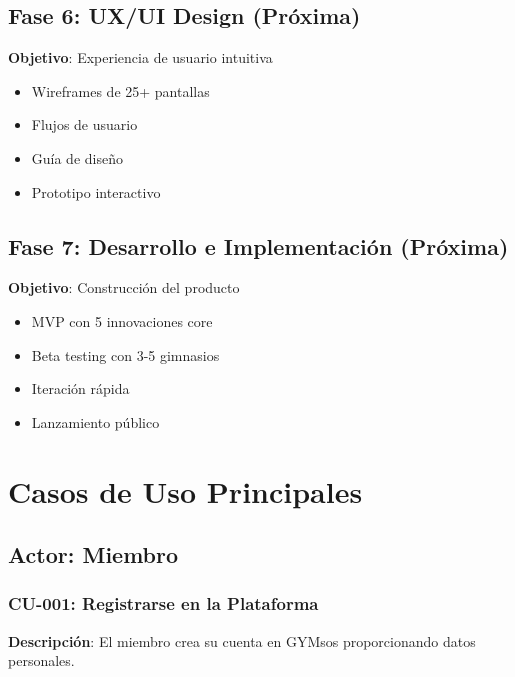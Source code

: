 \documentclass[11pt,a4paper]{article}
\begin{document}
\begin{itemize}
\subsection{Fase 6: UX/UI Design (Próxima)}

\textbf{Objetivo}: Experiencia de usuario intuitiva

\begin{itemize}
    \item Wireframes de 25+ pantallas
    \item Flujos de usuario
    \item Guía de diseño
    \item Prototipo interactivo
\end{itemize}

\subsection{Fase 7: Desarrollo e Implementación (Próxima)}

\textbf{Objetivo}: Construcción del producto

\begin{itemize}
    \item MVP con 5 innovaciones core
    \item Beta testing con 3-5 gimnasios
    \item Iteración rápida
    \item Lanzamiento público
\end{itemize}

\section{Casos de Uso Principales}

\subsection{Actor: Miembro}

\subsubsection{CU-001: Registrarse en la Plataforma}

\begin{definicion}
\textbf{Descripción}: El miembro crea su cuenta en GYMsos proporcionando datos personales.


\end{definicion}
\end{itemize}
\end{document}
